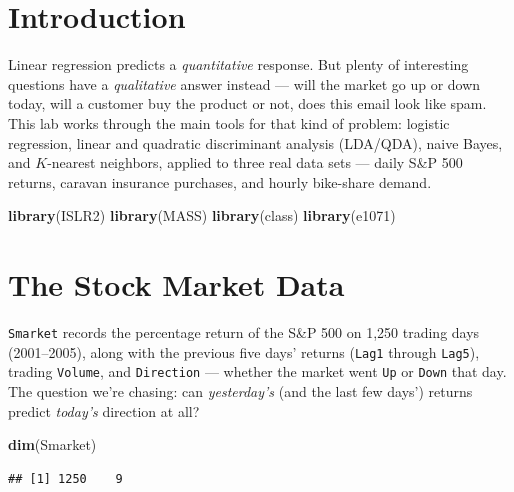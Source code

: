 \documentclass[
  11pt,
]{article}
\author{}
\date{\vspace{-2.5em}}
\newenvironment{Shaded}{\begin{snugshade}}{\end{snugshade}}
\newcommand{\FunctionTok}[1]{\textcolor[rgb]{0.13,0.29,0.53}{\textbf{#1}}}
\newcommand{\NormalTok}[1]{#1}
\begin{document}

\section{Introduction}\label{introduction}

Linear regression predicts a \emph{quantitative} response. But plenty of
interesting questions have a \emph{qualitative} answer instead --- will
the market go up or down today, will a customer buy the product or not,
does this email look like spam. This lab works through the main tools
for that kind of problem: logistic regression, linear and quadratic
discriminant analysis (LDA/QDA), naive Bayes, and \(K\)-nearest
neighbors, applied to three real data sets --- daily S\&P 500 returns,
caravan insurance purchases, and hourly bike-share demand.

\begin{Shaded}
\begin{Highlighting}[]
\FunctionTok{library}\NormalTok{(ISLR2)}
\FunctionTok{library}\NormalTok{(MASS)}
\FunctionTok{library}\NormalTok{(class)}
\FunctionTok{library}\NormalTok{(e1071)}
\end{Highlighting}
\end{Shaded}

\section{The Stock Market Data}\label{the-stock-market-data}

\texttt{Smarket} records the percentage return of the S\&P 500 on 1,250
trading days (2001--2005), along with the previous five days' returns
(\texttt{Lag1} through \texttt{Lag5}), trading \texttt{Volume}, and
\texttt{Direction} --- whether the market went \texttt{Up} or
\texttt{Down} that day. The question we're chasing: can
\emph{yesterday's} (and the last few days') returns predict
\emph{today's} direction at all?

\begin{Shaded}
\begin{Highlighting}[]
\FunctionTok{dim}\NormalTok{(Smarket)}
\end{Highlighting}
\end{Shaded}

\begin{verbatim}
## [1] 1250    9
\end{verbatim}
\end{document}
